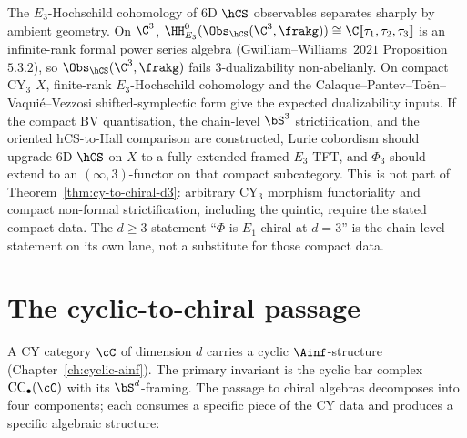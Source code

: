 \begin{conjecture}
\label{conj:cy3-compact-dualizability}
\ClaimStatusConjectured
The $E_3$-Hochschild cohomology of 6D $\hCS$ observables separates sharply by ambient geometry. On $\C^3$, $\HH^0_{E_3}(\Obs_{\hCS}(\C^3, \frakg)) \cong \C[\![\tau_1, \tau_2, \tau_3]\!]$ is an infinite-rank formal power series algebra (Gwilliam--Williams~$2021$ Proposition~$5.3.2$), so $\Obs_{\hCS}(\C^3, \frakg)$ fails $3$-dualizability non-abelianly. On compact CY$_3$ $X$, finite-rank $E_3$-Hochschild cohomology and the Calaque--Pantev--To\"en--Vaqui\'e--Vezzosi shifted-symplectic form give the expected dualizability inputs. If the compact BV quantisation, the chain-level $\bS^3$ strictification, and the oriented hCS-to-Hall comparison are constructed, Lurie cobordism should upgrade 6D $\hCS$ on $X$ to a fully extended framed $E_3$-TFT, and $\Phi_3$ should extend to an $(\infty, 3)$-functor on that compact subcategory. This is not part of Theorem~\ref{thm:cy-to-chiral-d3}: arbitrary CY$_3$ morphism functoriality and compact non-formal strictification, including the quintic, require the stated compact data. The $d \geq 3$ statement ``$\Phi$ is $E_1$-chiral at $d = 3$'' is the chain-level statement on its own lane, not a substitute for those compact data.
\end{conjecture}

\section{The cyclic-to-chiral passage}
\label{sec:cyclic-to-chiral}

A CY category $\cC$ of dimension $d$ carries a cyclic $\Ainf$-structure (Chapter~\ref{ch:cyclic-ainf}). The primary invariant is the cyclic bar complex $\mathrm{CC}_\bullet(\cC)$ with its $\bS^d$-framing. The passage to chiral algebras decomposes into four components; each consumes a specific piece of the CY data and produces a specific algebraic structure:

